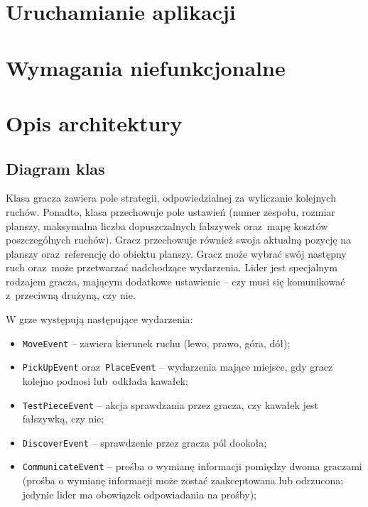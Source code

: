 \documentclass[a4paper]{article}
\newcommand{\code}{\texttt}
\begin{document}

\section{Uruchamianie aplikacji}


\section{Wymagania niefunkcjonalne}


\section{Opis architektury}

\subsection{Diagram klas}


Klasa gracza zawiera pole strategii, odpowiedzialnej za wyliczanie kolejnych ruchów.
Ponadto, klasa przechowuje pole ustawień (numer zespołu, rozmiar planszy, maksymalna liczba dopuszczalnych fałszywek oraz~mapę kosztów poszczególnych ruchów).
Gracz przechowuje również swoja aktualną pozycję na planszy oraz~referencję do obiektu planszy.
Gracz może wybrać swój następny ruch oraz~może przetwarzać nadchodzące wydarzenia.
Lider jest specjalnym rodzajem gracza, mającym dodatkowe ustawienie -- czy musi się komunikować z~przeciwną drużyną, czy nie.

\hfill 

W grze występują następujące wydarzenia:
\begin{itemize}
    \item \code{MoveEvent} -- zawiera kierunek ruchu (lewo, prawo, góra, dół);
    \item \code{PickUpEvent} oraz~\code{PlaceEvent} -- wydarzenia mające miejsce, gdy gracz kolejno podnosi lub~odkłada kawałek;
    \item \code{TestPieceEvent} -- akcja sprawdzania przez gracza, czy kawałek jest fałszywką, czy nie;
    \item \code{DiscoverEvent} -- sprawdzenie przez gracza pól dookoła;
    \item \code{CommunicateEvent} -- prośba o wymianę informacji pomiędzy dwoma graczami (prośba o wymianę informacji może zostać zaakceptowana lub odrzucona; jedynie lider ma obowiązek odpowiadania na prośby);
\end{itemize}
\end{document}

